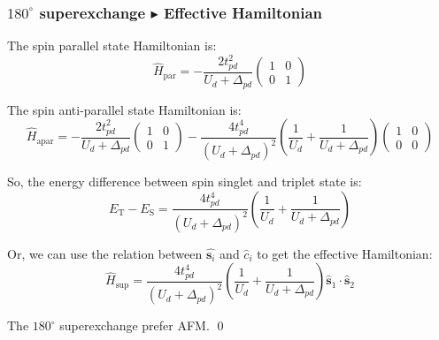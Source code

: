 \documentclass{beamer}
\begin{document}
  \begin{frame}
    \frametitle{\(180^{\circ}\) superexchange \(\blacktriangleright\) Effective Hamiltonian}\footnotesize
    The spin parallel state Hamiltonian is:
    \begin{equation}
      \widehat{H}_{\text{par}} = -\dfrac{2t_{pd}^2}{U_d + \Delta_{pd}}\begin{pmatrix}
        1 & 0\\
        0 & 1
      \end{pmatrix}
    \end{equation}

    The spin anti-parallel state Hamiltonian is:
    \begin{equation}
      \widehat{H}_{\text{apar}} = -\dfrac{2t_{pd}^2}{U_d + \Delta_{pd}}\begin{pmatrix}
        1&0\\
        0&1
      \end{pmatrix} - \dfrac{4t^4_{pd}}{(U_d+\Delta_{pd})^2}\left(\dfrac{1}{U_d} + \dfrac{1}{U_d+\Delta_{pd}}\right)\begin{pmatrix}
        1 & 0\\
        0 & 0
      \end{pmatrix}
    \end{equation}

    So, the energy difference between spin singlet and triplet state is:
    \begin{equation}
      E_\text{T} - E_\text{S} = \dfrac{4t^4_{pd}}{(U_d+\Delta_{pd})^2}\left(\dfrac{1}{U_d} + \dfrac{1}{U_d+\Delta_{pd}}\right)
    \end{equation}

    Or, we can use the relation between \(\widehat{\bm{s}_i}\) and \(\widehat{c}_i\) to get the effective Hamiltonian:
    \begin{equation}
      \widehat{H}_{\text{sup}} = \dfrac{4t^4_{pd}}{(U_d+\Delta_{pd})^2}\left(\dfrac{1}{U_d} + \dfrac{1}{U_d+\Delta_{pd}}\right) \widehat{\bm{s}}_1 \cdot \widehat{\bm{s}}_2
    \end{equation}

    The \(180^{\circ}\) superexchange prefer AFM. \qed
  \end{frame}
\end{document}

